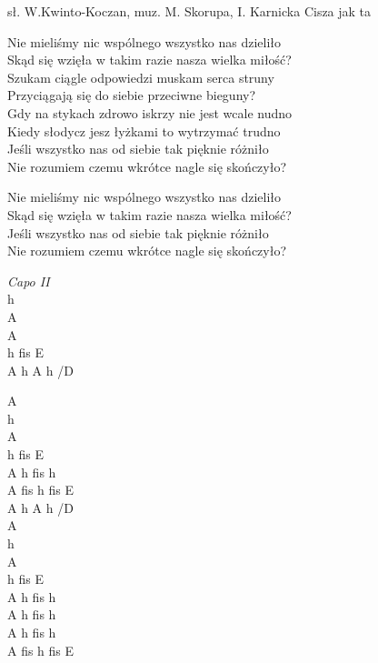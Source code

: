 {sł. W.Kwinto-Koczan, muz. M. Skorupa, I. Karnicka}
{Cisza jak ta}
\begin{text}
\hfill\break
Nie mieliśmy nic wspólnego wszystko nas dzieliło\\
Skąd się wzięła w takim razie nasza wielka miłość?\\
Szukam ciągle odpowiedzi muskam serca struny\\
Przyciągają się do siebie przeciwne bieguny?\\

\hfill\break
Gdy na stykach zdrowo iskrzy nie jest wcale nudno\\
Kiedy słodycz jesz łyżkami to wytrzymać trudno\\
Jeśli wszystko nas od siebie tak pięknie różniło\\
Nie rozumiem czemu wkrótce nagle się skończyło?

\hfill\break
\hfill\break
\hfill\break
Nie mieliśmy nic wspólnego wszystko nas dzieliło\\
Skąd się wzięła w takim razie nasza wielka miłość?\\
Jeśli wszystko nas od siebie tak pięknie różniło\\
Nie rozumiem czemu wkrótce nagle się skończyło?

\hfill\break
\hfill\break
\hfill\break
\end{text}
\begin{chord}
\textit{Capo II}\\
h\\
A\\
A\\
h fis E\\
\vin A h A h /D

A\\
h\\
A\\
h fis E\\
\vin A h fis h\\
\vin A fis h fis E\\
\vin A h A h /D\\

A\\
h\\
A\\
h fis E\\
\vin A h fis h\\
\vin A h fis h\\
\vin A h fis h\\
\vin A fis h fis E\\
\end{chord}
